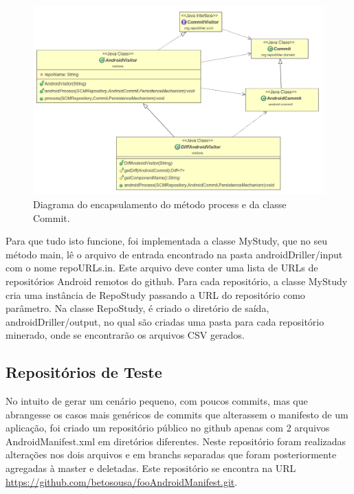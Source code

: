 \documentclass[a4paper,12pt]{article}
\begin{document}
\begin{figure}[h]
\centering
\includegraphics[width=\linewidth]{imgs/diagram.png}
\caption{Diagrama do encapsulamento do método process e da classe Commit.}
\label{fig:diagram}
\end{figure}


Para que tudo isto funcione, foi implementada a classe MyStudy, que no seu método main,  lê o arquivo de entrada encontrado na pasta androidDriller/input com o nome repoURLs.in. Este arquivo deve conter uma lista de URLs de repositórios Android remotos do github. Para cada repositório, a classe MyStudy cria uma instância de RepoStudy passando a URL do repositório como parâmetro. Na classe RepoStudy, é criado o diretório de saída, androidDriller/output, no qual são criadas uma pasta para cada repositório minerado,  onde se encontrarão os arquivos CSV gerados. 


\subsection{Repositórios de Teste}%
\label{sec:repoteste}

No intuito de gerar um cenário pequeno, com poucos commits, mas que abrangesse os casos mais genéricos de commits que alterassem o manifesto de um aplicação, foi criado um repositório público no github apenas com 2 arquivos AndroidManifest.xml em diretórios diferentes. Neste repositório foram realizadas alterações nos dois arquivos e em branchs separadas que foram posteriormente agregadas à master e deletadas. Este repositório se encontra na URL {\fontsize{10pt}{12pt}\url{https://github.com/betosousa/fooAndroidManifest.git}}.
\end{document}
